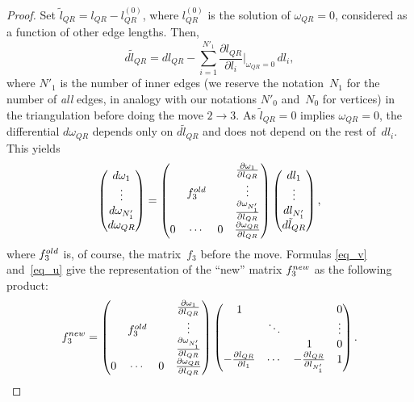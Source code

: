 \documentclass[11pt]{article}
\begin{document}
\begin{proof}
Set $\tilde l_{QR} = l_{QR} - l^{(0)}_{QR}$, where $l^{(0)}_{QR}$ is the solution of $\omega_{QR} = 0$, considered as a function of other edge lengths. Then,
\begin{equation}
d\tilde l_{QR} = dl_{QR} - \sum\limits_{i=1}^{N'_1} \frac{\partial l_{QR}}{\partial l_i}{\Big|}_{\omega_{QR} = 0} \, dl_i,
\label{eq_u}
\end{equation}
where $N'_1$ is the number of inner edges (we reserve the notation~$N_1$ for the number of \emph{all} edges, in analogy with our notations $N'_0$ and~$N_0$ for vertices) in the triangulation before doing the move $2\to 3$. As $\tilde l_{QR}=0$ implies $\omega_{QR}=0$, the dif\/ferential $d\omega_{QR}$ depends only on $d\tilde l_{QR}$ and does not depend on the rest of~$dl_i$. This yields
\begin{equation}
\begin{pmatrix}
d\omega_1 \\
\vdots \\
d\omega_{N'_1} \\
d\omega_{QR}
\end{pmatrix} =
\begin{pmatrix}
{} & {} & {} & \frac{\partial\omega_1}{\partial l_{QR}} \\
{} & f_3^{\rm old} & {} & \vdots \\
{} & {} & {} & \frac{\partial\omega_{N'_1}}{\partial l_{QR}} \\
0 & \cdots & 0 & \frac{\partial\omega_{QR}}{\partial l_{QR}}
\end{pmatrix}
\begin{pmatrix}
dl_1 \\
\vdots \\
dl_{N'_1} \\
d\tilde l_{QR}
\end{pmatrix},
\label{eq_v}
\end{equation}
where $f_3^{\rm old}$ is, of course, the matrix~$f_3$ before the move. Formulas \eqref{eq_v} and~\eqref{eq_u} give the representation of the ``new'' matrix $f_3^{\rm new}$ as the following product:
\begin{equation*}
f_3^{\rm new} =
\begin{pmatrix}
{} & {} & {} & \frac{\partial\omega_1}{\partial l_{QR}} \\
{} & f_3^{\rm old} & {} & \vdots \\
{} & {} & {} & \frac{\partial\omega_{N'_1}}{\partial l_{QR}} \\
0 & \cdots & 0 & \frac{\partial\omega_{QR}}{\partial l_{QR}}
\end{pmatrix}
\begin{pmatrix}
1 & {} & {} & 0 \\
{} & \ddots & {} & \vdots \\
{} & {} & 1 & 0 \\
- \frac{\partial l_{QR}}{\partial l_1} & \cdots & - \frac{\partial l_{QR}}{\partial l_{N'_1}} & 1
\end{pmatrix}.
\end{equation*}


\end{proof}
\end{document}
